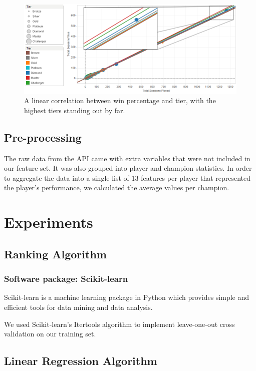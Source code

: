 \documentclass{article} %
\begin{document}
\begin{figure}[h!]
\centering
\includegraphics[scale=0.7]{win_percentage.png}
\caption{A linear correlation between win percentage and tier, with the highest tiers standing out by far.}
\label{fig:univerise}
\end{figure}

\subsection{Pre-processing}
The raw data from the API came with extra variables that were not included in our feature set. It was also grouped into player and champion statistics. In order to aggregate the data into a single list of 13 features per player that represented the player's performance, we calculated the average values per champion.




\section{Experiments}

\subsection{Ranking Algorithm}

\subsubsection{Software package: Scikit-learn}
Scikit-learn is a machine learning package in Python which provides simple and efficient tools for data mining and data analysis.

We used Scikit-learn's Itertools algorithm to implement leave-one-out cross validation on our training set.




\subsection{Linear Regression Algorithm}
\end{document}
